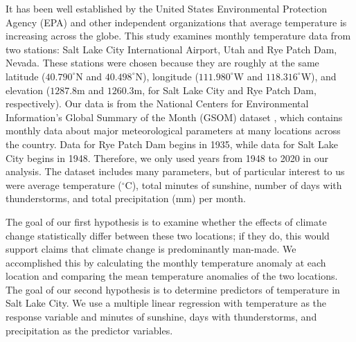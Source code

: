 It has been well established by the United States Environmental Protection Agency (EPA) and other independent organizations that average temperature is increasing across the globe\cite{temp_anomaly}. This study examines monthly temperature data from two stations: Salt Lake City International Airport, Utah and Rye Patch Dam, Nevada. These stations were chosen because they are roughly at the same latitude ($40.790^{\circ}$N and $40.498^{\circ}$N), longitude ($111.980^{\circ}$W and $118.316^{\circ}$W), and elevation ($1287.8$m and $1260.3$m, for Salt Lake City and Rye Patch Dam, respectively). Our data is from the National Centers for Environmental Information's Global Summary of the Month (GSOM) dataset \cite{gsom_data}, which contains monthly data about major meteorological parameters at many locations across the country. Data for Rye Patch Dam begins in 1935, while data for Salt Lake City begins in 1948. Therefore, we only used years from 1948 to 2020 in our analysis. The dataset includes many parameters, but of particular interest to us were average temperature (${}^{\circ}$C), total minutes of sunshine, number of days with thunderstorms, and total precipitation (mm) per month.

The goal of our first hypothesis is to examine whether the effects of climate change statistically differ between these two locations; if they do, this would support claims that climate change is predominantly man-made\cite{obama_report}. We accomplished this by calculating the monthly temperature anomaly at each location and comparing the mean temperature anomalies of the two locations. The goal of our second hypothesis is to determine predictors of temperature in Salt Lake City. We use a multiple linear regression with temperature as the response variable and minutes of sunshine, days with thunderstorms, and precipitation as the predictor variables.